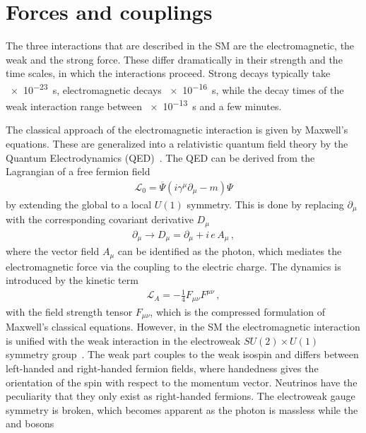 
\section{Forces and couplings}
\label{sec:standardmodel:forces}

The three interactions that are described in the SM are the electromagnetic,
the weak and the strong force. These differ dramatically in their strength and
the time scales, in which the interactions proceed. Strong decays typically
take \SI{e-23}{\second}, electromagnetic decays \SI{e-16}{\second}, while the
decay times of the weak interaction range between \SI{e-13}{\second} and a few
minutes.

The classical approach of the electromagnetic interaction is given by
Maxwell's equations. These are generalized into a relativistic quantum field
theory by the Quantum Electrodynamics
(QED)~\cite{Tomonaga01081946,Schwinger-QED1,*Schwinger-QED2,Feynman-QED1,*Feynman-QED2,*Feynman-QED3}.
The QED can be derived from the Lagrangian of a free fermion field
\begin{align}
	\mathcal{L}_0 = \overline{\Psi} (i\gamma^\mu \partial_\mu - m) \Psi
\end{align}
by extending the global to a local $U(1)$ symmetry. This is done by replacing
$\partial_\mu$ with the corresponding covariant derivative $D_\mu$
\begin{align}
	\partial_\mu \to D_\mu = \partial_\mu + i\,e\,A_\mu\,,
\end{align}
where the vector field $A_\mu$ can be identified as the photon, which mediates
the electromagnetic force via the coupling to the electric charge. The
dynamics is introduced by the kinetic term
\begin{align}
	\mathcal{L}_A = - \frac 14 F_{\mu\nu}F^{\mu\nu}\,,
\end{align}
with the field strength tensor $F_{\mu\nu}$, which is the compressed
formulation of Maxwell's classical equations. However, in the SM the
electromagnetic interaction is unified with the weak interaction in the
electroweak $SU(2)\times U(1)$ symmetry
group~\cite{Glashow:1961tr,Salam:1964ry,Weinberg:1967tq}. The weak part
couples to the weak isospin and differs between left-handed and right-handed
fermion fields, where handedness gives the orientation of the spin with
respect to the momentum vector. Neutrinos have the peculiarity that they only
exist as right-handed fermions. The electroweak gauge symmetry is broken,
which becomes apparent as the photon is massless while the \Wpm and \Z bosons
